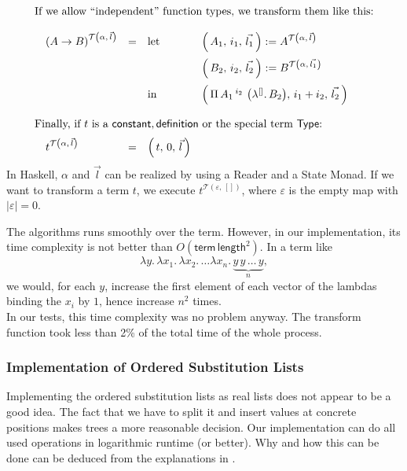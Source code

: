\documentclass[12pt, a4paper, titlepage]{article}
\newcommand{\sspace}{\,}
\newcommand{\type}{\mathsf{Type}}
\newcommand{\la}{\lambda}
\newcommand{\emptyVec}{[]}
\newcommand{\LaA}[2]{\la {#1}. \sspace #2}
\newcommand{\LaO}[2]{\la ^{#1} . \sspace #2}
\newcommand{\PiO}[3]{\Pi \sspace #1 \sspace ^{#2} \sspace #3}
\newcommand{\transO}[3]{ {#1}^{\mathcal{T}\left({#2}, \sspace {#3}\right)}}
\newcommand{\result}[3]{\left( \, {#1}, \sspace {#2}, \sspace {#3} \, \right)}
\begin{document}
\[\begin{array}{lllll}
\\
\\
\multicolumn{5}{l}{\mbox{If we allow ``independent'' function types, we transform them like this:}} \\ \\
& \transO{\left( A \rightarrow B \right)}{\alpha}{\vec l} & = & \mbox{let } &\result{A_1}{i_1}{\vec{l_1}} := \transO{A}{\alpha}{\vec l} \\
\noalign{\medskip}
				      &&&             &\result{B_2}{i_2}{\vec{l_2}} := \transO{B}{\alpha}{\vec{l_1}} \\
\noalign{\medskip}
				      &&& \mbox{in }  &\result{\PiO {A_1} {i_2} \left({\LaO \emptyVec B_2}\right)}{i_1 + i_2}{\vec {l_2}}
\\
\\
\multicolumn{5}{l}{\mbox{Finally, if $t$ is a $\mathsf{constant}, \mathsf{definition}$ or the special term $\type$:}} \\
\noalign{\medskip}
& \transO{t}{\alpha}{\vec l} & = & \result{t}{0}{\vec l}
\end{array}
\]
In Haskell, $\alpha$ and $\vec l$ can be realized by using a Reader and a State Monad. If we want to transform a term $t$, we execute $\transO{t}{\varepsilon}{\emptyVec}$, where $\varepsilon$ is the empty map with $|\varepsilon| = 0$.

The algorithms runs smoothly over the term. However, in our implementation, its time complexity is not better than $O(\mathsf{term\, length}^2)$.
In a term like 
\[
\LaA y {\LaA {x_1} {\LaA {x_2} {\ldots \LaA {x_n} { \underbrace{y \sspace y \sspace \ldots \sspace y}_{n}    }    }}},
\]
we would, for each $y$, increase the first element of each vector of the lambdas binding the $x_i$ by $1$, hence increase $n^2$ times. 
\\
In our tests, this time complexity was no problem anyway. The transform function took less than 2\% of the total time of the whole process.

\subsubsection{Implementation of Ordered Substitution Lists}
Implementing the ordered substitution lists as real lists does not appear to be a good idea. The fact that we have to split it and insert values at concrete positions makes trees a more reasonable decision. Our implementation can do all used operations in logarithmic runtime (or better). Why and how this can be done can be deduced from the explanations in \cite{adams}. 
\end{document}
